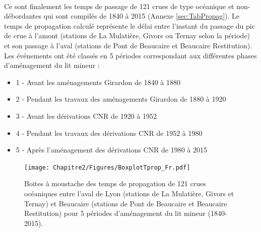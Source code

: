 	\paragraph{} Ce sont finalement les temps de passage de 121 crues de type océanique et non-débordantes qui sont compilés de 1840 à 2015 (Annexe \ref{sec:TabPropag}). Le temps de propagation calculé représente le délai entre l'instant du passage du pic de crue à l'amont (stations de La Mulatière, Givors ou Ternay selon la période) et son passage à l'aval (stations de Pont de Beaucaire et Beaucaire Restitution). Les événements ont été classés en 5 périodes correspondant aux différentes phases d'aménagement du lit mineur : 
	\begin{itemize}
		\item 1 - Avant les aménagements Girardon de 1840 à 1880
		\item 2 - Pendant les travaux des aménagements Girardon de 1880 à 1920
		\item 3 - Avant les dérivations CNR de 1920 à 1952
		\item 4 - Pendant les travaux des dérivations CNR de 1952 à 1980
		\item 5 - Après l'aménagement des dérivations CNR de 1980 à 2015
	\end{itemize}

	\begin{figure}[h!]
		\centering
			\texttt{[image: Chapitre2/Figures/BoxplotTprop\_Fr.pdf]}
	        \caption{Boites à moustache des temps de propagation de 121 crues océaniques entre l'aval de Lyon (stations de La Mulatière, Givors et Ternay) et Beaucaire (stations de Pont de Beaucaire et Beaucaire Restitution) pour 5 périodes d'aménagement du lit mineur (1840-2015).}
			\label{fig:BoxplotPropag}
		\end{figure}	


